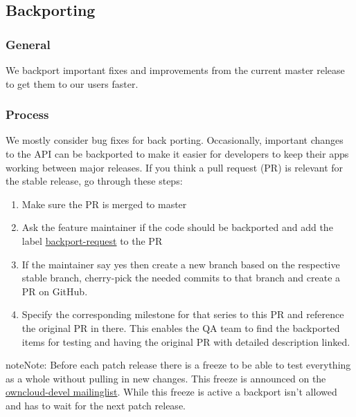 \documentclass[letterpaper,10pt,english]{sphinxmanual}
\begin{document}
\subsection{Backporting}
\label{general/backporting::doc}\label{general/backporting:backporting}

\subsubsection{General}
\label{general/backporting:general}
We backport important fixes and improvements from the current master release to get them to our users faster.


\subsubsection{Process}
\label{general/backporting:process}
We mostly consider bug fixes for back porting. Occasionally, important changes to the API can be backported to make it easier for developers to keep their apps working between major releases. If you think a pull request (PR) is relevant for the stable release, go through these steps:
\begin{enumerate}
\item {} 
Make sure the PR is merged to master

\item {} 
Ask the feature maintainer if the code should be backported and add the label \href{https://github.com/owncloud/core/labels/Backport-Request}{backport-request} to the PR

\item {} 
If the maintainer say yes then create a new branch based on the respective stable branch, cherry-pick the needed commits to that branch and create a PR on GitHub.

\item {} 
Specify the corresponding milestone for that series to this PR and reference the original PR in there. This enables the QA team to find the backported items for testing and having the original PR with detailed description linked.

\end{enumerate}

\begin{notice}{note}{Note:}
Before each patch release there is a freeze to be able to test everything as a whole without pulling in new changes. This freeze is announced on the \href{https://mailman.owncloud.org/pipermail/devel/}{owncloud-devel mailinglist}. While this freeze is active a backport isn't allowed and has to wait for the next patch release.
\end{notice}
\end{document}
